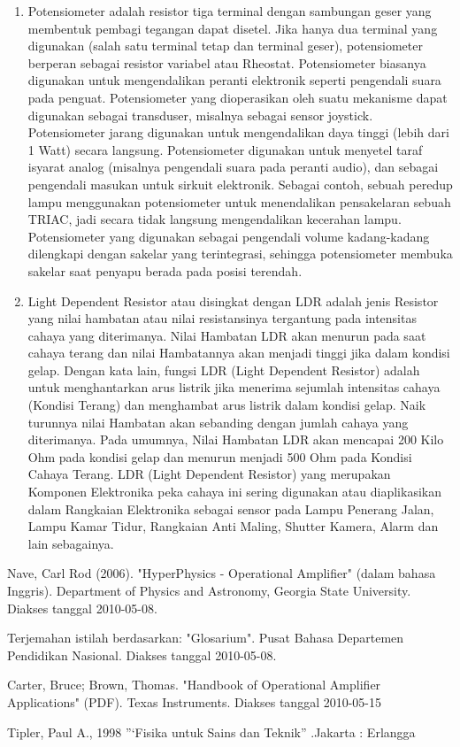 \documentclass[12pt,a4paper]{article}
\begin{document}
\begin{enumerate}
\item Potensiometer adalah resistor tiga terminal dengan sambungan geser yang membentuk pembagi tegangan dapat disetel. Jika hanya dua terminal yang digunakan (salah satu terminal tetap dan terminal geser), potensiometer berperan sebagai resistor variabel atau Rheostat. Potensiometer biasanya digunakan untuk mengendalikan peranti elektronik seperti pengendali suara pada penguat. Potensiometer yang dioperasikan oleh suatu mekanisme dapat digunakan sebagai transduser, misalnya sebagai sensor joystick. Potensiometer jarang digunakan untuk mengendalikan daya tinggi (lebih dari 1 Watt) secara langsung. Potensiometer digunakan untuk menyetel taraf isyarat analog (misalnya pengendali suara pada peranti audio), dan sebagai pengendali masukan untuk sirkuit elektronik. Sebagai contoh, sebuah peredup lampu menggunakan potensiometer untuk menendalikan pensakelaran sebuah TRIAC, jadi secara tidak langsung mengendalikan kecerahan lampu. Potensiometer yang digunakan sebagai pengendali volume kadang-kadang dilengkapi dengan sakelar yang terintegrasi, sehingga potensiometer membuka sakelar saat penyapu berada pada posisi terendah.

\item Light Dependent Resistor atau disingkat dengan LDR adalah jenis Resistor yang nilai hambatan atau nilai resistansinya tergantung pada intensitas cahaya yang diterimanya. Nilai Hambatan LDR akan menurun pada saat cahaya terang dan nilai Hambatannya akan menjadi tinggi jika dalam kondisi gelap. Dengan kata lain, fungsi LDR (Light Dependent Resistor) adalah untuk menghantarkan arus listrik jika menerima sejumlah intensitas cahaya (Kondisi Terang) dan menghambat arus listrik dalam kondisi gelap. Naik turunnya nilai Hambatan akan sebanding dengan jumlah cahaya yang diterimanya. Pada umumnya, Nilai Hambatan LDR akan mencapai 200 Kilo Ohm pada kondisi gelap dan menurun menjadi 500 Ohm pada Kondisi Cahaya Terang. LDR (Light Dependent Resistor) yang merupakan Komponen Elektronika peka cahaya ini sering digunakan atau diaplikasikan dalam Rangkaian Elektronika sebagai sensor pada Lampu Penerang Jalan, Lampu Kamar Tidur, Rangkaian Anti Maling, Shutter Kamera, Alarm dan lain sebagainya.

\end{enumerate}

\newpage
\begin{thebibliography}{99} %
 {Nave, Carl Rod (2006). "HyperPhysics - Operational Amplifier" (dalam bahasa Inggris). Department of Physics and Astronomy, Georgia State University. Diakses tanggal 2010-05-08. }

 {Terjemahan istilah berdasarkan: "Glosarium". Pusat Bahasa Departemen Pendidikan Nasional. Diakses tanggal 2010-05-08.}

 {Carter, Bruce; Brown, Thomas. "Handbook of Operational Amplifier Applications" (PDF). Texas Instruments. Diakses tanggal 2010-05-15}

 {Tipler, Paul A., 1998 ”‘Fisika untuk Sains dan Teknik” .Jakarta : Erlangga }

\end{thebibliography}
\end{document}
